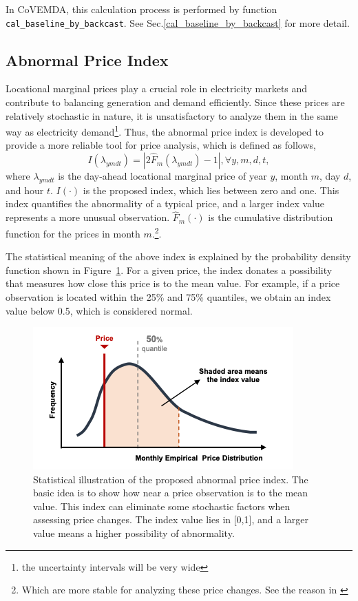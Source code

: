 \documentclass[10pt]{article}
\newcommand{\covemda}{CoVEMDA}
\numberwithin{equation}{section}
\numberwithin{table}{section}
\numberwithin{figure}{section}
\begin{document}
In \covemda{}, this calculation process is performed by function \verb!cal_baseline_by_backcast!. See Sec.\ref{cal_baseline_by_backcast} for more detail.



\subsection{Abnormal Price Index}\label{subsec:abnormal_price_index}

Locational marginal prices play a crucial role in electricity markets and contribute to balancing generation and demand efficiently. Since these prices are relatively stochastic in nature, it is unsatisfactory to analyze them in the same way as electricity demand\footnote{the uncertainty intervals will be very wide}. Thus, the abnormal price index is developed to provide a more reliable tool for price analysis, which is defined as follows,
\begin{equation*}
  I(\lambda_{ymdt})=|2\hat F_m(\lambda_{ymdt})-1|, \forall y,m,d,t,
\end{equation*}
where $\lambda_{ymdt}$ is the day-ahead locational marginal price of year $y$, month $m$, day $d$, and hour $t$. $I(\cdot)$ is the proposed index, which lies between zero and one. This index quantifies the abnormality of a typical price, and a larger index value represents a more unusual observation. $\hat F_m(\cdot)$ is the cumulative distribution function for the prices in month $m$.\footnote{Which are more stable for analyzing these price changes. See the reason in \cite{quantitaveassess}}.

The statistical meaning of the above index is explained by the probability density function shown in Figure~\ref{fig:abnormal_price_index}. For a given price, the index donates a possibility that measures how close this price is to the mean value. For example, if a price observation is located within the 25\% and 75\% quantiles, we obtain an index value below 0.5, which is considered normal.
\begin{figure}
  \centering
  \includegraphics[width=.8\textwidth]{figures/abnormal_price_index.png}
  \caption{Statistical illustration of the proposed abnormal price index. The basic idea is to show how near a price observation is to the mean value. This index can eliminate some stochastic factors when assessing price changes. The index value lies in [0,1], and a larger value means a higher possibility of abnormality.}
  \label{fig:abnormal_price_index}
\end{figure}
\end{document}
